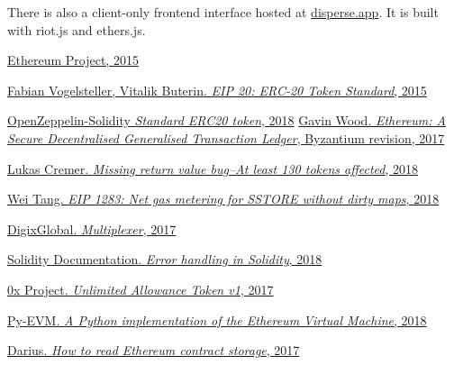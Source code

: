 \documentclass[12pt]{article}
\begin{document}
There is also a client-only frontend interface hosted at \href{https://disperse.app/}{disperse.app}. It is built with riot.js and ethers.js.

\begin{thebibliography}{1}

 \href{https://www.ethereum.org}{Ethereum Project, 2015}
 
  \href{https://eips.ethereum.org/EIPS/eip-20}{Fabian Vogelsteller, Vitalik Buterin. {\em EIP 20: ERC-20 Token Standard}, 2015}

  \href{https://github.com/OpenZeppelin/openzeppelin-solidity/blob/v2.0.0/contracts/token/ERC20/ERC20.sol#L151-L164}{OpenZeppelin-Solidity {\em Standard ERC20 token}, 2018}
  \href{http://gavwood.com/paper.pdf}{Gavin Wood. {\em Ethereum: A Secure Decentralised Generalised Transaction Ledger}, Byzantium revision, 2017}
 	
  \href{https://medium.com/p/d67bf08521ca}{Lukas Cremer. {\em Missing return value bug--At least 130 tokens affected}, 2018}
 	
  \href{https://eips.ethereum.org/EIPS/eip-1283}{Wei Tang. {\em EIP 1283: Net gas metering for SSTORE without dirty maps}, 2018}
 	
  \href{https://github.com/DigixGlobal/multiplexer}{DigixGlobal. {\em Multiplexer}, 2017}
 	
  \href{https://solidity.readthedocs.io/en/latest/control-structures.html#error-handling-assert-require-revert-and-exceptions}{Solidity Documentation. {\em Error handling in Solidity}, 2018}
 	
  \href{https://github.com/0xProject/0x-monorepo/blob/48ff13e3e22bf9f71bc1a367f86aaa0ae89989ae/packages/contracts/contracts/tokens/ZRXToken/UnlimitedAllowanceToken_v1.sol#L43-L45}{0x Project. {\em Unlimited Allowance Token v1}, 2017}
 
 \href{https://github.com/ethereum/py-evm}{Py-EVM. {\em A Python implementation of the Ethereum Virtual Machine}, 2018}

 \href{https://medium.com/aigang-network/how-to-read-ethereum-contract-storage-44252c8af925}{Darius. {\em How to read Ethereum contract storage}, 2017}

\end{thebibliography}

\appendix
\end{document}
